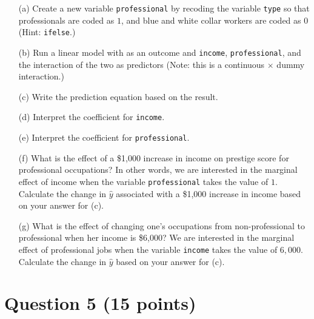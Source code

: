 \documentclass[12pt,letterpaper]{article}
\begin{document}
\begin{enumerate}
	
\item [(a)]
	Create a new variable \texttt{professional} by recoding the variable \texttt{type} so that professionals are coded as $1$, and blue and white collar workers are coded as $0$ (Hint: \texttt{ifelse}.)
	
	\vspace{6cm}
	
	
\item [(b)]
	Run a linear model with  as an outcome and \texttt{income}, \texttt{professional}, and the interaction of the two as predictors (Note: this is a continuous $\times$ dummy interaction.)
	
\newpage	
\item [(c)]
	Write the prediction equation based on the result.
	
\vspace{7cm}	
\item [(d)]
	Interpret the coefficient for \texttt{income}.
	
\vspace{7cm}	
\item [(e)]
	Interpret the coefficient for \texttt{professional}.
	
\newpage
\item [(f)]
	What is the effect of a \$1,000 increase in income on prestige score for professional occupations? In other words, we are interested in the marginal effect of income when the variable \texttt{professional} takes the value of $1$. Calculate the change in $\hat{y}$ associated with a \$1,000 increase in income based on your answer for (c).
	
	\vspace{10cm}
	
	
\item [(g)]
	What is the effect of changing one's occupations from non-professional to professional when her income is \$6,000? We are interested in the marginal effect of professional jobs when the variable \texttt{income} takes the value of $6,000$. Calculate the change in $\hat{y}$ based on your answer for (c).
	

\end{enumerate}

\newpage
\section*{Question 5 (15 points)}
\end{document}
